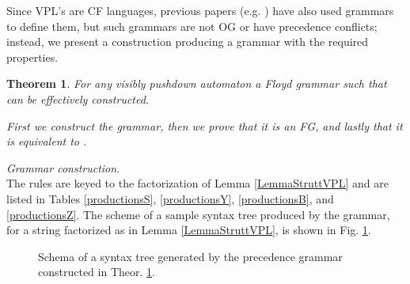 \documentclass[3p,11pt]{elsarticle}
\newtheorem{theorem}{Theorem}[section]
\newenvironment{proof}[1][Proof]{\begin{trivlist}
\item[\hskip \labelsep {\bfseries #1}]}{\end{trivlist}}
\begin{document}
\par
Since VPL's are CF languages, previous papers (e.g. \cite{LaTorreNP06}) have also used grammars to define them,
 but such grammars are not OG or have precedence conflicts; instead, we present a construction producing a grammar with the required properties.
\begin{theorem}\label{TheorVPD2OPG}
For any  visibly pushdown automaton  a Floyd grammar  such that  can be effectively constructed.
\begin{proof}
 First we construct the grammar, then we prove that it is an FG, and lastly that it is equivalent to .
\end{proof}
\end{theorem}
\emph{Grammar construction}.\label{OPGgrammarConstr}
\\
 The rules are keyed to the factorization of Lemma \ref{LemmaStruttVPL} and are listed in Tables \ref{productionsS}, \ref{productionsY},  \ref{productionsB}, and \ref{productionsZ}. The scheme of a sample syntax tree produced by the grammar, for a string factorized as in Lemma \ref{LemmaStruttVPL}, is shown in Fig. \ref{figureTree}.
\begin{figure}[h!]
\begin{center}
\end{center}
\caption{\label{figureTree}Schema of a syntax tree generated by the precedence grammar constructed in Theor. \ref{TheorVPD2OPG}.}
\end{figure}
\end{document}
